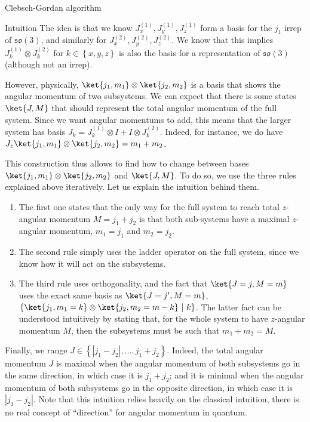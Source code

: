 \documentclass[a4paper]{article}
\begin{document}
\begin{parag}{Clebsch-Gordan algorithm}
    \begin{subparag}{Intuition}
        The idea is that we know $J_x^{\left(1\right)}, J_y^{\left(1\right)}, J_z^{\left(1\right)}$ form a basis for the $j_1$ irrep of $\mathfrak{so}\left(3\right)$, and similarly for $J_x^{\left(2\right)}, J_y^{\left(2\right)}, J_z^{\left(2\right)}$. We know that this implies $J_k^{\left(1\right)} \otimes J_k^{\left(2\right)}$ for $k \in \left\{x, y, z\right\}$ is also the basis for a representation of $\mathfrak{so}\left(3\right)$ (although not an irrep). 

        However, physically, $\ket{j_1, m_1} \otimes \ket{j_2, m_2}$ is a basis that shows the angular momentum of two subsystems. We can expect that there is some states $\ket{J, M}$ that should represent the total angular momentum of the full system. Since we want angular momentums to add, this means that the larger system has basis $J_k = J_k^{\left(1\right)} \otimes I + I \otimes J_k^{\left(2\right)}$. Indeed, for instance, we do have $J_z \ket{j_1, m_1} \otimes \ket{j_2, m_2} = m_1 + m_2$.

        This construction thus allows to find how to change between bases $\ket{j_1, m_1} \otimes \ket{j_2, m_2}$ and $\ket{J, M}$. To do so, we use the three rules explained above iteratively. Let us explain the intuition behind them.
        \begin{enumerate}
            \item  The first one states that the only way for the full system to reach total $z$-angular momentum $M = j_1 + j_2$ is that both sub-systems have a maximal $z$-angular momentum, $m_1 = j_1$ and $m_2 = j_2$. 
            \item The second rule simply uses the ladder operator on the full system, since we know how it will act on the subsystems.
            \item The third rule uses orthogonality, and the fact that $\ket{J = j, M = m}$ uses the exact same basis as $\ket{J = j', M = m}$, $\left\{\ket{j_1, m_1 = k} \otimes \ket{j_2, m_2 = m-k} \suchthat k\right\}$. The latter fact can be understood intuitively by stating that, for the whole system to have $z$-angular momentum $M$, then the subsystems must be such that $m_1 + m_2 = M$.
        \end{enumerate}
        

        Finally, we range $J \in \left\{\left|j_1 - j_2\right|, \ldots, j_1 + j_2\right\}$. Indeed, the total angular momentum $J$ is maximal when the angular momentum of both subsystems go in the same direction, in which case it is $j_1 + j_2$; and it is minimal when the angular momentum of both subsystems go in the opposite direction, in which case it is $\left|j_1 - j_2\right|$. Note that this intuition relies heavily on the classical intuition, there is no real concept of ``direction'' for angular momentum in quantum.
    \end{subparag}
\end{parag}
\end{document}
